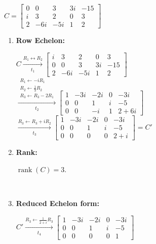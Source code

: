 $C=
\begin{bmatrix}
    0 & 0 & 3 & 3i & -15 \\
    i & 3 & 2 & 0 & 3 \\
    2 & -6i & -5i & 1 & 2
\end{bmatrix}
$ \\[1.0em]

\begin{enumerate}
    \item
    \textbf{Row Echelon:} \\[1.0em]
    \begin{answer}
        $C \xrightarrow[t_1]{R_1 \leftrightarrow R_2}
        \begin{bmatrix}
            i & 3 & 2 & 0 & 3 \\
            0 & 0 & 3 & 3i & -15 \\
            2 & -6i & -5i & 1 & 2
        \end{bmatrix}
        $ \\[1.0em]

        $\xrightarrow[t_2]{
            \substack{
                R_1 \leftarrow -iR_1 \\
                R_2 \leftarrow \frac{1}{3}R_2 \\
                R_3 \leftarrow R_3 - 2R_1
            }
        }
        \begin{bmatrix}
            1 & -3i & -2i & 0 & -3i \\
            0 & 0 & 1 & i & -5 \\
            0 & 0 & -i & 1 & 2+6i
        \end{bmatrix}
        $
        $\xrightarrow[t_3]{R_3 \leftarrow R_3+iR_2}
        \begin{bmatrix}
            1 & -3i & -2i & 0 & -3i \\
            0 & 0 & 1 & i & -5 \\
            0 & 0 & 0 & 0 & 2+i
        \end{bmatrix}
        = C'$
    \end{answer}

    \item
    \textbf{Rank:}
    \begin{answer}
        $\operatorname{rank}(C)=3.$
    \end{answer} \\

    \item
    \textbf{Reduced Echelon form:} \\[1.0em]
    \begin{answer}
        $C' \xrightarrow[t_4]{R_3 \leftarrow \frac{1}{2+i}R_3}
        \begin{bmatrix}
            1 & -3i & -2i & 0 & -3i \\
            0 & 0 & 1 & i & -5 \\
            0 & 0 & 0 & 0 & 1
        \end{bmatrix}
        $ \\[1.0em]


\end{answer}
\end{enumerate}
